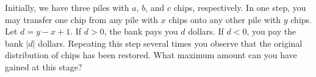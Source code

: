 Initially, we have three piles with $a$, $b$, and $c$ chips, respectively. In one step, you may transfer one chip from any pile with $x$ chips onto any other pile with $y$ chips. Let $d = y - x + 1$. If $d > 0$, the bank pays you $d$ dollars. If $d < 0$, you pay the bank $|d|$ dollars. Repeating this step several times you observe that the original distribution of chips has been restored. What maximum amount can you have gained at this stage?

